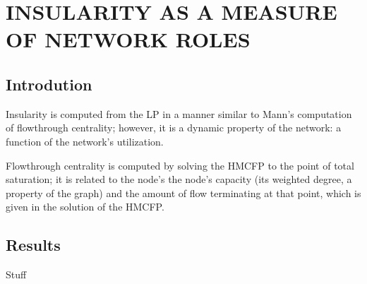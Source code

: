 \chapter{INSULARITY AS A MEASURE OF NETWORK ROLES} \label{ch:insularity}%

\section{Introdution} \label{sec:insularity introduction} %

Insularity is computed from the LP in a manner similar to Mann's computation of flowthrough centrality; however, it is a dynamic property of the network: a function of the network's utilization. 

Flowthrough centrality is computed by solving the HMCFP to the point of total saturation; it is related to the node's the node's capacity (its weighted degree, a property of the graph) and the amount of flow terminating at that point, which is given in the solution of the HMCFP. 

\section{Results}

Stuff
